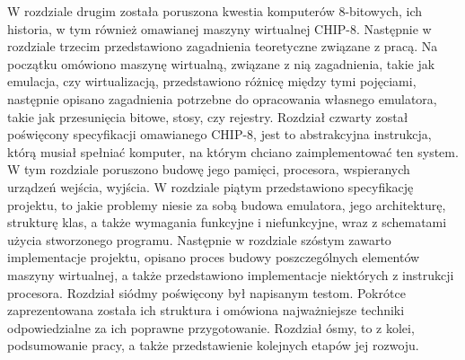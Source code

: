 W rozdziale drugim została poruszona kwestia komputerów 8-bitowych, ich historia, w tym również omawianej maszyny wirtualnej CHIP-8. Następnie w rozdziale trzecim przedstawiono zagadnienia teoretyczne związane z pracą. Na początku omówiono maszynę wirtualną, związane z nią zagadnienia, takie jak emulacja, czy wirtualizacją, przedstawiono różnicę między tymi pojęciami, następnie opisano zagadnienia potrzebne do opracowania własnego emulatora, takie jak przesunięcia bitowe, stosy, czy rejestry. Rozdział czwarty został poświęcony specyfikacji omawianego CHIP-8, jest to abstrakcyjna instrukcja, którą musiał spełniać komputer, na którym chciano zaimplementować ten system. W tym rozdziale poruszono budowę jego pamięci, procesora, wspieranych urządzeń wejścia, wyjścia. W rozdziale piątym przedstawiono specyfikację projektu, to jakie problemy niesie za sobą budowa emulatora, jego architekturę, strukturę klas, a także wymagania funkcyjne i niefunkcyjne, wraz z schematami użycia stworzonego programu. Następnie w rozdziale szóstym zawarto implementacje projektu, opisano proces budowy poszczególnych elementów maszyny wirtualnej, a także przedstawiono implementacje niektórych z instrukcji procesora. Rozdział siódmy poświęcony był napisanym testom. Pokrótce zaprezentowana została ich struktura i omówiona najważniejsze techniki odpowiedzialne za ich poprawne przygotowanie. Rozdział ósmy, to z kolei, podsumowanie pracy, a także przedstawienie kolejnych etapów jej rozwoju.